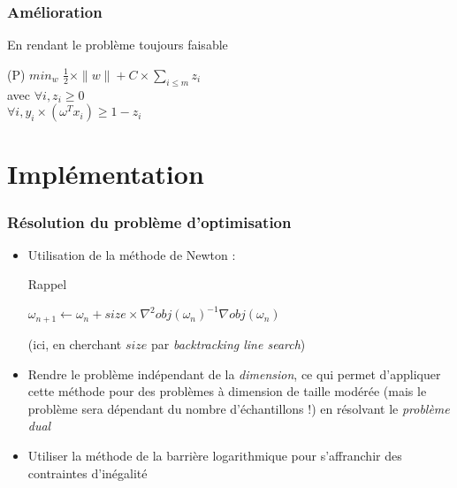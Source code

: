 \documentclass{beamer}
\begin{document}
\begin{frame}
\frametitle{Amélioration}

\begin{block}{En rendant le problème toujours faisable}

           \begin{centre}
           (P) $min_{w}$ $\frac{1}{2} \times \|w\| + C \times \sum_{i \leq m}z_i$\\
           avec $\forall i, z_i \geq 0$\\
           $\forall i, y_i \times (\omega^{T} x_i) \geq 1 - z_i$\\
           \end{centre}

\end{block}

\end{frame}

\section{Implémentation}

\begin{frame}
\frametitle{Résolution du problème d'optimisation}

\begin{itemize}
\item Utilisation de la méthode de Newton :

\begin{block}{Rappel}
          \begin{center}
          $\omega_{n+1} \leftarrow \omega_{n} + size \times \nabla^2 obj(\omega_n)^{-1}\nabla obj(\omega_n)$
          \end{center}

  (ici, en cherchant $size$ par \emph{backtracking line search})
\end{block}

\item Rendre le problème indépendant de la \emph{dimension}, ce qui permet d'appliquer cette méthode pour des problèmes à dimension de taille modérée (mais le problème sera dépendant du nombre d'échantillons !) en résolvant le \emph{problème dual}

\item Utiliser la méthode de la barrière logarithmique pour s'affranchir des contraintes d'inégalité

\end{itemize}

\end{frame}
\end{document}
